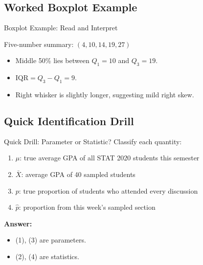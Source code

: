 \documentclass[aspectratio=169]{beamer}
\begin{document}
\subsection{Worked Boxplot Example}
\begin{frame}{Boxplot Example: Read and Interpret}
  \centering

  \vspace{1mm}
  Five-number summary: \((4,10,14,19,27)\)

  \vspace{1mm}
  \begin{itemize}
    \item Middle 50\% lies between \(Q_1=10\) and \(Q_3=19\).
    \item \(\mathrm{IQR}=Q_3-Q_1=9\).
    \item Right whisker is slightly longer, suggesting mild right skew.
  \end{itemize}
\end{frame}

\subsection{Quick Identification Drill}
\begin{frame}{Quick Drill: Parameter or Statistic?}
  Classify each quantity:
  \begin{enumerate}
    \item \(\mu\): true average GPA of all STAT 2020 students this semester
    \item \(\bar X\): average GPA of 40 sampled students
    \item \(p\): true proportion of students who attended every discussion
    \item \(\hat p\): proportion from this week's sampled section
  \end{enumerate}
  \pause
  \textbf{Answer:}
  \begin{itemize}
    \item (1), (3) are parameters.
    \item (2), (4) are statistics.
  \end{itemize}
\end{frame}
\end{document}
